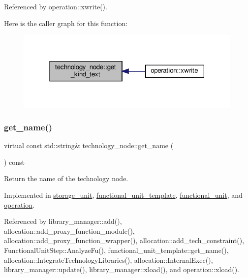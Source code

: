 Referenced by operation\+::xwrite().

Here is the caller graph for this function\+:
\nopagebreak
\begin{figure}[H]
\begin{center}
\leavevmode
\includegraphics[width=315pt]{df/d06/structtechnology__node_a4b8785a8d6c2db19e1bec0d3eef5c8f2_icgraph}
\end{center}
\end{figure}
\mbox{\label{structtechnology__node_ade1d568637cfe8de91fc732fba4d62d5}} 
\subsubsection{\texorpdfstring{get\+\_\+name()}{get\_name()}}
{\footnotesize\ttfamily virtual const std\+::string\& technology\+\_\+node\+::get\+\_\+name (\begin{DoxyParamCaption}{ }\end{DoxyParamCaption}) const\hspace{0.3cm}{\ttfamily [pure virtual]}}



Return the name of the technology node. 



Implemented in \hyperlink{structstorage__unit_a264a6ad9a5d692f1f779e4c803df33d7}{storage\+\_\+unit}, \hyperlink{structfunctional__unit__template_a135ff73a6ceafc2ebb4e662b8b13f34e}{functional\+\_\+unit\+\_\+template}, \hyperlink{structfunctional__unit_a9761616dcfc8f37c93431d4260127ceb}{functional\+\_\+unit}, and \hyperlink{structoperation_af507cadd6f2ee17b88e7cb62772fe1f2}{operation}.



Referenced by library\+\_\+manager\+::add(), allocation\+::add\+\_\+proxy\+\_\+function\+\_\+module(), allocation\+::add\+\_\+proxy\+\_\+function\+\_\+wrapper(), allocation\+::add\+\_\+tech\+\_\+constraint(), Functional\+Unit\+Step\+::\+Analyze\+Fu(), functional\+\_\+unit\+\_\+template\+::get\+\_\+name(), allocation\+::\+Integrate\+Technology\+Libraries(), allocation\+::\+Internal\+Exec(), library\+\_\+manager\+::update(), library\+\_\+manager\+::xload(), and operation\+::xload().

